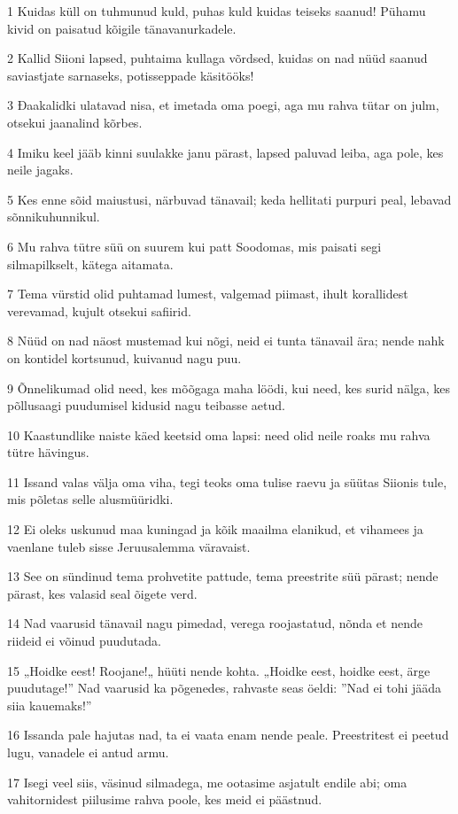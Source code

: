 \par 1 Kuidas küll on tuhmunud kuld, puhas kuld kuidas teiseks saanud! Pühamu kivid on paisatud kõigile tänavanurkadele.
\par 2 Kallid Siioni lapsed, puhtaima kullaga võrdsed, kuidas on nad nüüd saanud saviastjate sarnaseks, potisseppade käsitööks!
\par 3 Ðaakalidki ulatavad nisa, et imetada oma poegi, aga mu rahva tütar on julm, otsekui jaanalind kõrbes.
\par 4 Imiku keel jääb kinni suulakke janu pärast, lapsed paluvad leiba, aga pole, kes neile jagaks.
\par 5 Kes enne sõid maiustusi, närbuvad tänavail; keda hellitati purpuri peal, lebavad sõnnikuhunnikul.
\par 6 Mu rahva tütre süü on suurem kui patt Soodomas, mis paisati segi silmapilkselt, kätega aitamata.
\par 7 Tema vürstid olid puhtamad lumest, valgemad piimast, ihult korallidest verevamad, kujult otsekui safiirid.
\par 8 Nüüd on nad näost mustemad kui nõgi, neid ei tunta tänavail ära; nende nahk on kontidel kortsunud, kuivanud nagu puu.
\par 9 Õnnelikumad olid need, kes mõõgaga maha löödi, kui need, kes surid nälga, kes põllusaagi puudumisel kidusid nagu teibasse aetud.
\par 10 Kaastundlike naiste käed keetsid oma lapsi: need olid neile roaks mu rahva tütre hävingus.
\par 11 Issand valas välja oma viha, tegi teoks oma tulise raevu ja süütas Siionis tule, mis põletas selle alusmüüridki.
\par 12 Ei oleks uskunud maa kuningad ja kõik maailma elanikud, et vihamees ja vaenlane tuleb sisse Jeruusalemma väravaist.
\par 13 See on sündinud tema prohvetite pattude, tema preestrite süü pärast; nende pärast, kes valasid seal õigete verd.
\par 14 Nad vaarusid tänavail nagu pimedad, verega roojastatud, nõnda et nende riideid ei võinud puudutada.
\par 15 „Hoidke eest! Roojane!„ hüüti nende kohta. „Hoidke eest, hoidke eest, ärge puudutage!” Nad vaarusid ka põgenedes, rahvaste seas öeldi: ”Nad ei tohi jääda siia kauemaks!”
\par 16 Issanda pale hajutas nad, ta ei vaata enam nende peale. Preestritest ei peetud lugu, vanadele ei antud armu.
\par 17 Isegi veel siis, väsinud silmadega, me ootasime asjatult endile abi; oma vahitornidest piilusime rahva poole, kes meid ei päästnud.
